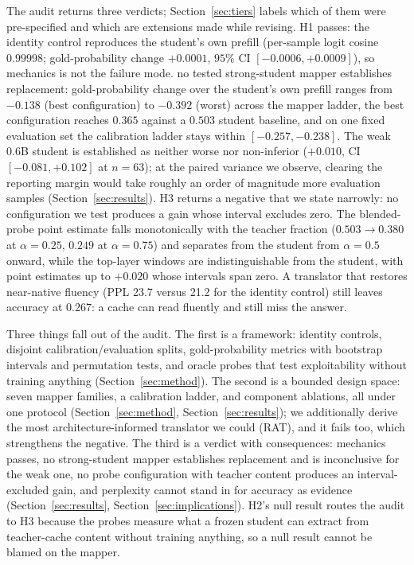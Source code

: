 \documentclass[10pt]{article}
\begin{document}
The audit returns three verdicts; Section~\ref{sec:tiers} labels which of them
were pre-specified and which are extensions made while revising. H1 passes: the
identity control reproduces the student's own prefill (per-sample logit cosine
$0.99998$; gold-probability change $+0.0001$, $95\%$ CI $[-0.0006, +0.0009]$),
so mechanics is not the failure mode. no tested strong-student mapper establishes replacement:
gold-probability change over the student's own prefill ranges from $-0.138$
(best configuration) to $-0.392$ (worst) across the mapper ladder, the best
configuration reaches $0.365$ against a $0.503$ student baseline, and on one
fixed evaluation set the calibration ladder stays within $[-0.257, -0.238]$.
The weak 0.6B student is established as neither worse nor non-inferior
($+0.010$, CI $[-0.081, +0.102]$ at $n{=}63$); at the paired variance we
observe, clearing the reporting margin would take roughly an order of
magnitude more evaluation samples (Section~\ref{sec:results}). H3 returns a
negative that we state narrowly: no configuration we test produces a gain whose
interval excludes zero. The blended-probe point estimate falls monotonically
with the teacher fraction ($0.503 \to 0.380$ at $\alpha{=}0.25$, $0.249$ at
$\alpha{=}0.75$) and separates from the student from $\alpha{=}0.5$ onward,
while the top-layer windows are indistinguishable from the student, with point
estimates up to $+0.020$ whose intervals span zero. A translator that restores
near-native fluency (PPL 23.7 versus 21.2 for the identity control) still leaves
accuracy at $0.267$: a cache can read fluently and still miss the answer.

Three things fall out of the audit. The first is a framework: identity
controls, disjoint calibration/evaluation splits, gold-probability metrics
with bootstrap intervals and permutation tests, and oracle probes that test
exploitability without training anything (Section~\ref{sec:method}). The
second is a bounded design space: seven mapper families, a calibration ladder,
and component ablations, all under one protocol
(Section~\ref{sec:method}, Section~\ref{sec:results}); we additionally derive
the most architecture-informed translator we could (RAT), and it fails too,
which strengthens the negative. The third is a verdict
with consequences: mechanics passes, no strong-student mapper establishes replacement
and is inconclusive for the weak one, no probe configuration with teacher
content produces an interval-excluded gain, and perplexity
cannot stand in for accuracy as evidence (Section~\ref{sec:results},
Section~\ref{sec:implications}). H2's null result routes the audit to H3
because the probes measure what a frozen student can extract from
teacher-cache content without training anything, so a null result cannot
be blamed on the mapper.
\end{document}
